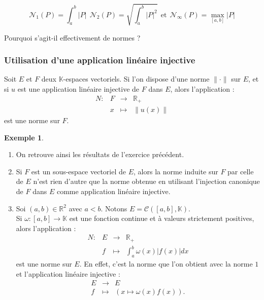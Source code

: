 \documentclass[french]{article}
\newcommand{\R}{\mathbb{R}}
\newcommand{\K}{\mathbb{K}}
\theoremstyle{plain}
\theoremstyle{definition}
\newtheorem*{ex}{Exemple}
\theoremstyle{remark}
\begin{document}
$$\mathcal{N}_1(P)=\int_{a}^{b}\lvert P\rvert\ \ \mathcal{N}_2(P)=\sqrt{\int_{a}^{b}\lvert P\rvert^2}\ \ \text{et}\ \ \mathcal{N}_\infty(P)=\underset{[a,b]}{\max}\lvert P\rvert$$

\begin{exo}
	Pourquoi s'agit-il effectivement de normes ?
\end{exo}

\subsubsection*{Utilisation d'une application linéaire injective}

Soit $E$ et $F$ deux $\K$-espaces vectoriels. Si l'on dispose d'une norme $\lVert\cdot\rVert$ sur $E$, et si $u$ est une application linéaire injective de $F$ dans $E$, alors l'application : $$\begin{array}{lrcl}
	N:&F&\longrightarrow&\R_+\\
	&x&\longmapsto&\lVert u(x)\rVert
\end{array}$$ est une norme sur $F$.

\begin{ex}
	\begin{enumerate}
		\item On retrouve ainsi les résultats de l'exercice précédent.
		\item Si $F$ est un sous-espace vectoriel de $E$, alors la norme induite sur $F$ par celle de $E$ n'est rien d'autre que la norme obtenue en utilisant l'injection canonique de $F$ dans $E$ comme application linéaire injective.
		\item Soi $(a,b)\in\R^2$ avec $a<b$. Notons $E=\mathcal{C}([a,b],\K)$.\\
		Si $\omega:[a,b]\to\K$ est une fonction continue et à valeurs strictement positives, alors l'application : $$\begin{array}{lrcl}
			N:&E&\longrightarrow&\R_+\\
			&f&\longmapsto&\displaystyle\int_{a}^{b}\omega(x)\lvert f(x)\rvert dx
		\end{array}$$ est une norme sur $E$. En effet, c'est la norme que l'on obtient avec la norme $1$ et l'application linéaire injective : $$\begin{array}{rcl}
		E&\longrightarrow&E\\
		f&\longmapsto&(x\mapsto\omega(x)f(x)).
		\end{array}$$
	\end{enumerate}
\end{ex}
\end{document}
